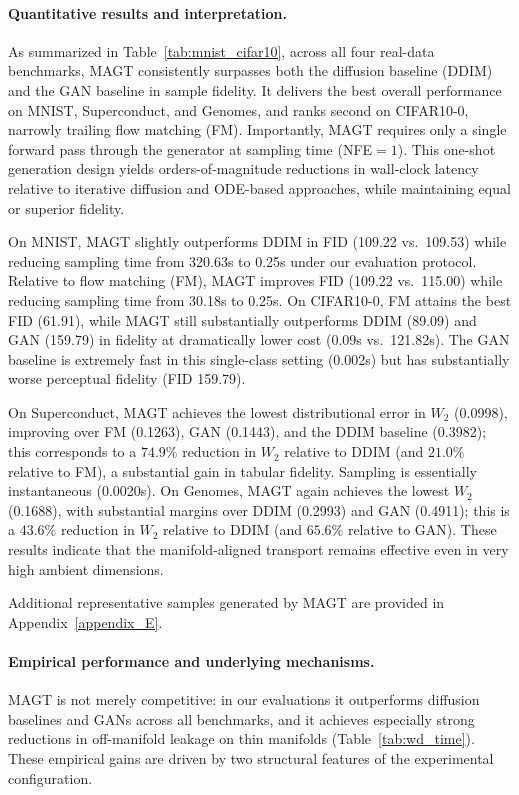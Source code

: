 \documentclass[12pt]{article}
\theoremstyle{definition} %
\providecommand{\method}{MAGT} %
\begin{document}
\paragraph{Quantitative results and interpretation.}
As summarized in Table~\ref{tab:mnist_cifar10}, across all four real-data benchmarks, \method{} consistently surpasses both the diffusion baseline (DDIM) and the GAN baseline in sample fidelity. It delivers the best overall performance on MNIST, Superconduct, and Genomes, and ranks second on CIFAR10-0, narrowly trailing flow matching (FM). Importantly, \method{} requires only a single forward pass through the generator at sampling time (NFE$=1$). This one-shot generation design yields orders-of-magnitude reductions in wall-clock latency relative to iterative diffusion and ODE-based approaches, while maintaining equal or superior fidelity.

On MNIST, \method{} slightly outperforms DDIM in FID (109.22 vs.\ 109.53) while reducing sampling time from 320.63s to 0.25s under our evaluation protocol.
Relative to flow matching (FM), \method{} improves FID (109.22 vs.\ 115.00) while reducing sampling time from 30.18s to 0.25s.
On CIFAR10-0, FM attains the best FID (61.91), while \method{} still substantially outperforms DDIM (89.09) and GAN (159.79) in fidelity at dramatically lower cost (0.09s vs.\ 121.82s).
The GAN baseline is extremely fast in this single-class setting (0.002s) but has substantially worse perceptual fidelity (FID 159.79).

On Superconduct, \method{} achieves the lowest distributional error in $W_2$ (0.0998), improving over FM (0.1263), GAN (0.1443), and the DDIM baseline (0.3982); this corresponds to a $74.9\%$ reduction in $W_2$ relative to DDIM (and $21.0\%$ relative to FM), a substantial gain in tabular fidelity. Sampling is essentially instantaneous (0.0020s).
On Genomes, \method{} again achieves the lowest $W_2$ (0.1688), with substantial margins over DDIM (0.2993) and GAN (0.4911); this is a $43.6\%$ reduction in $W_2$ relative to DDIM (and $65.6\%$ relative to GAN). These results indicate that the manifold-aligned transport remains effective even in very high ambient dimensions.

Additional representative samples generated by \method{} are provided in Appendix~\ref{appendix_E}.

\paragraph{Empirical performance and underlying mechanisms.}
\method{} is not merely competitive: in our evaluations it outperforms diffusion baselines and GANs across all benchmarks, and it achieves especially strong reductions in off-manifold leakage on thin manifolds (Table~\ref{tab:wd_time}).
These empirical gains are driven by two structural features of the experimental configuration.
\end{document}
